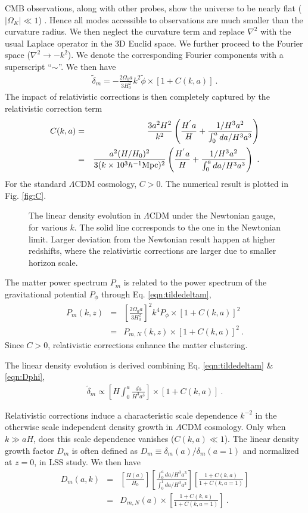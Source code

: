 \documentclass[aps,prl,showpacs,nobibnotes,twocolumn,
nobalancelastpage,superscriptaddress]{revtex4}
\newcommand{\ba}{\begin{eqnarray}}
\newcommand{\ea}{\end{eqnarray}}
\newcommand{\bfi}{\begin{figure}
\epsfxsize=9cm
\epsffile}
\newcommand{\efi}{\end{figure}}
\newcommand{\mpch}{h^{-1} {\rm Mpc}}
\begin{document}
CMB observations, along with other probes,  show the universe to be nearly
flat ($|\Omega_K|\ll  1$) \cite{flat}.    Hence all modes accessible to
observations are much smaller than the curvature radius. We then
neglect the curvature term and replace $\nabla^2$ with the usual Laplace
operator in the 3D Euclid space. We further proceed to the Fourier space
($\nabla^2\rightarrow -k^2$). We denote the corresponding Fourier components
with a superscript ``$\sim$''.   We then have
\ba 
\label{eqn:tildedeltam}
\tilde{\delta}_m=-\frac{2\Omega_0a}{3H_0^2}k^2\tilde{\phi}\times \left[1+C(k,a)\right]\ . 
\ea
The impact of relativistic corrections is then completely captured by the
relativistic correction  term
\ba
C(k,a)&=&\frac{3a^2H^2}{k^2}\left(\frac{H^{'}a}{H}+\frac{1/H^3a^2}{\int_0^a
    da/H^3a^3} \right)\\
&=&\frac{a^2(H/H_0)^2}{3(k\times 10^3\mpch)^2}\left(\frac{H^{'}a}{H}+\frac{1/H^3a^2}{\int_0^a
    da/H^3a^3} \right)\nonumber\ .
\ea
For the standard $\Lambda$CDM cosmology, $C>0$. The numerical result is plotted in Fig. \ref{fig:C}.


\bfi{fig2.eps}
\caption{The linear density evolution in $\Lambda$CDM under the Newtonian
  gauge, for various $k$. The solid line corresponds to the one in the
  Newtonian limit.  Larger deviation from the Newtonian result happen at
  higher redshifts, where the relativistic corrections are larger due to
  smaller horizon scale. \label{fig:D}}
\efi



The matter power spectrum $P_m$ is related to the power spectrum of the
gravitational potential $P_\phi$ through Eq. \ref{eqn:tildedeltam}, 
\ba
P_m(k,z)&=&\left[\frac{2\Omega_0a}{3H_0^2}\right]^2k^4P_\phi\times
\left[1+C(k,a)\right]^2 \\
&=& P_{m,N}(k,z)\times \left[1+C(k,a)\right]^2\ . \nonumber
\ea
 Since $C>0$, relativistic corrections enhance the matter clustering. 

The linear density evolution is derived combining Eq. \ref{eqn:tildedeltam} \&
\ref{eqn:Dphi}, 
\ba
\tilde{\delta}_m\propto \left[H\int_0^a \frac{da}{H^3a^3}\right] \times \left[1+C(k,a)\right]\ .
\ea

Relativistic corrections induce a characteristic scale
dependence $k^{-2}$ in the otherwise scale independent density
growth in $\Lambda$CDM cosmology. Only when $k\gg aH$, does this 
scale dependence vanishes ($C(k,a)\ll 1$).
The linear density growth factor $D_m$ is often defined as $D_m\equiv
\delta_m(a)/\delta_m(a=1)$ and normalized at $z=0$, in LSS study. We then have
\ba
\label{eqn:D}
D_m(a,k)&=&\left[\frac{H(a)}{H_0}\right]\left[\frac{\int_0^a da/H^3a^3}{\int_0^1
    da/H^3a^3}\right]\left[\frac{1+C(k,a)}{1+C(k,a=1)}\right] \nonumber \\
&=& D_{m,N}(a)\times \left[\frac{1+C(k,a)}{1+C(k,a=1)}\right] \ .
\ea
\end{document}

